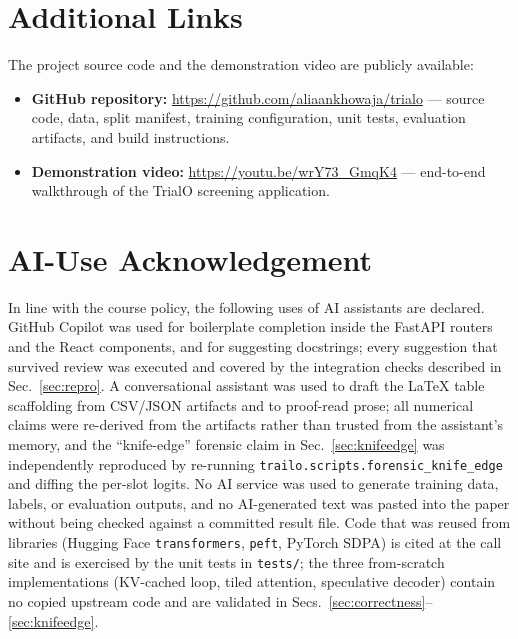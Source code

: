 \documentclass[conference]{IEEEtran}
\newcommand{\code}[1]{\texttt{\small #1}}
\begin{document}



\appendices
\section{Additional Links}
\label{app:links}

The project source code and the demonstration video are publicly available:

\begin{itemize}[leftmargin=*, itemsep=1pt, topsep=2pt]
\item \textbf{GitHub repository:} \url{https://github.com/aliaankhowaja/trialo} --- source code, data, split manifest, training configuration, unit tests, evaluation artifacts, and build instructions.
\item \textbf{Demonstration video:} \url{https://youtu.be/wrY73_GmqK4} --- end-to-end walkthrough of the TrialO screening application.
\end{itemize}

\section{AI-Use Acknowledgement}
\label{app:aiuse}

In line with the course policy, the following uses of AI assistants are
declared. GitHub Copilot was used for boilerplate completion inside the
FastAPI routers and the React components, and for suggesting docstrings;
every suggestion that survived review was executed and covered by the
integration checks described in Sec.~\ref{sec:repro}. A conversational
assistant was used to draft the LaTeX table scaffolding from CSV/JSON
artifacts and to proof-read prose; all numerical claims were
re-derived from the artifacts rather than trusted from the assistant's memory,
and the ``knife-edge'' forensic claim in Sec.~\ref{sec:knifeedge} was
independently reproduced by re-running
\code{trailo.scripts.forensic\_knife\_edge} and diffing the per-slot
logits. No AI service was used to generate training data, labels, or
evaluation outputs, and no AI-generated text was pasted into the paper
without being checked against a committed result file. Code that was
reused from libraries (Hugging Face \code{transformers},
\code{peft}, PyTorch SDPA) is cited at the call site and is exercised
by the unit tests in \code{tests/}; the three from-scratch
implementations (KV-cached loop, tiled attention, speculative
decoder) contain no copied upstream code and are validated in
Secs.~\ref{sec:correctness}--\ref{sec:knifeedge}.
\end{document}
